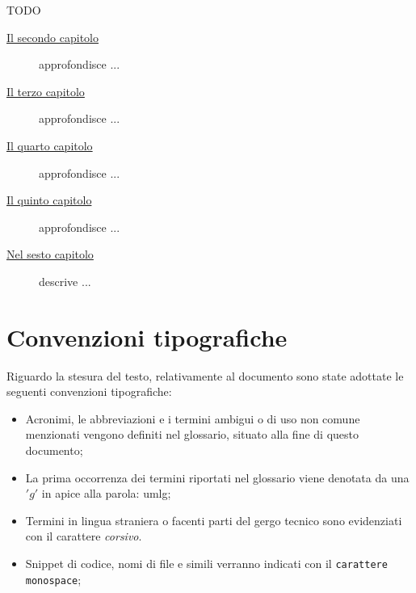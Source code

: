 {\Huge TODO}
\begin{description}
    \item[{\hyperref[cap:descrizione-stage]{Il secondo capitolo}}] approfondisce ...
    
    \item[{\hyperref[cap:analisi-requisiti]{Il terzo capitolo}}] approfondisce ...
    
    \item[{\hyperref[cap:progettazione-codifica]{Il quarto capitolo}}] approfondisce ...
    
    \item[{\hyperref[cap:verifica-validazione]{Il quinto capitolo}}] approfondisce ...
    
    \item[{\hyperref[cap:conclusioni]{Nel sesto capitolo}}] descrive ...
\end{description}

\section{Convenzioni tipografiche}
Riguardo la stesura del testo, relativamente al documento sono state adottate le seguenti convenzioni tipografiche:
\begin{itemize}
	\item Acronimi, le abbreviazioni e i termini ambigui o di uso non comune menzionati vengono
        definiti nel glossario, situato alla fine di questo documento;
    \item La prima occorrenza dei termini riportati nel glossario viene denotata da una $'g'$ in
        apice alla parola: \gls{umlg};
	\item Termini in lingua straniera o facenti parti del gergo tecnico sono evidenziati con il
        carattere \emph{corsivo}.
	\item  Snippet di codice, nomi di file e simili verranno indicati con il \texttt{carattere monospace};
\end{itemize}